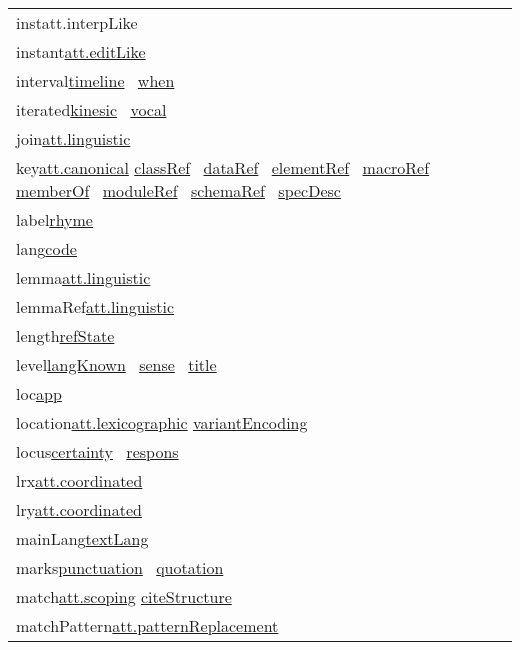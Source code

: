 \begin{longtable}{L{.2\textwidth}P{.8\textwidth}}
inst\tabcellsep att.interpLike\\
instant\tabcellsep \hyperref[TEI.att.editLike]{att.editLike}\\
interval\tabcellsep \hyperref[TEI.timeline]{timeline}  \hyperref[TEI.when]{when} \\
iterated\tabcellsep \hyperref[TEI.kinesic]{kinesic}  \hyperref[TEI.vocal]{vocal} \\
join\tabcellsep \hyperref[TEI.att.linguistic]{att.linguistic}\\
key\tabcellsep \hyperref[TEI.att.canonical]{att.canonical} \hyperref[TEI.classRef]{classRef}  \hyperref[TEI.dataRef]{dataRef}  \hyperref[TEI.elementRef]{elementRef}  \hyperref[TEI.macroRef]{macroRef}  \hyperref[TEI.memberOf]{memberOf}  \hyperref[TEI.moduleRef]{moduleRef}  \hyperref[TEI.schemaRef]{schemaRef}  \hyperref[TEI.specDesc]{specDesc} \\
label\tabcellsep \hyperref[TEI.rhyme]{rhyme} \\
lang\tabcellsep \hyperref[TEI.code]{code} \\
lemma\tabcellsep \hyperref[TEI.att.linguistic]{att.linguistic}\\
lemmaRef\tabcellsep \hyperref[TEI.att.linguistic]{att.linguistic}\\
length\tabcellsep \hyperref[TEI.refState]{refState} \\
level\tabcellsep \hyperref[TEI.langKnown]{langKnown}  \hyperref[TEI.sense]{sense}  \hyperref[TEI.title]{title} \\
loc\tabcellsep \hyperref[TEI.app]{app} \\
location\tabcellsep \hyperref[TEI.att.lexicographic]{att.lexicographic} \hyperref[TEI.variantEncoding]{variantEncoding} \\
locus\tabcellsep \hyperref[TEI.certainty]{certainty}  \hyperref[TEI.respons]{respons} \\
lrx\tabcellsep \hyperref[TEI.att.coordinated]{att.coordinated}\\
lry\tabcellsep \hyperref[TEI.att.coordinated]{att.coordinated}\\
mainLang\tabcellsep \hyperref[TEI.textLang]{textLang} \\
marks\tabcellsep \hyperref[TEI.punctuation]{punctuation}  \hyperref[TEI.quotation]{quotation} \\
match\tabcellsep \hyperref[TEI.att.scoping]{att.scoping} \hyperref[TEI.citeStructure]{citeStructure} \\
matchPattern\tabcellsep \hyperref[TEI.att.patternReplacement]{att.patternReplacement}\\

\end{longtable}
